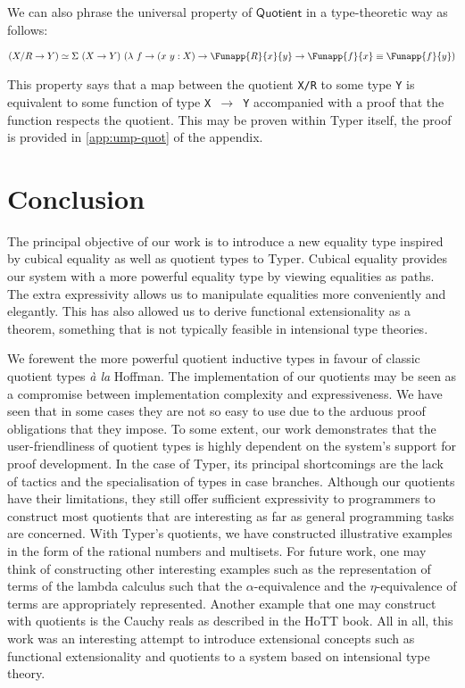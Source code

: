 \documentclass[12pt,twoside,maitrise]{dms}
\theoremstyle{definition}
\numberwithin{equation}{section}
\numberwithin{table}{chapter}
\numberwithin{figure}{chapter}
\newcommand\kw[1] {\textsf{#1}}
\newcommand\id[1] {\texttt{#1}}
\newcommand\fn[1] {\texttt{#1}}
\newcommand\latinphrase{\textit}
\begin{document}
We can also phrase the universal property of $\kw{Quotient}$ in a type-theoretic
way as follows:

\begin{align*}
  & (X/R \rightarrow Y) \simeq \Sigma \ (X \rightarrow Y) \ (\lambda \ f \rightarrow (x \ y : X) \rightarrow \Funapp{R}{x}{y} \rightarrow \Funapp{f}{x} \equiv \Funapp{f}{y}) \\
\end{align*}

This property says that a map between the quotient \fn{X/R} to some type \id{Y}
is equivalent to some function of type \fn{X $\rightarrow$ Y} accompanied with a
proof that the function respects the quotient. This may be proven within Typer
itself, the proof is provided in \autoref{app:ump-quot} of the appendix.

\chapter{Conclusion}

The principal objective of our work is to introduce a new equality type inspired
by cubical equality as well as quotient types to Typer. Cubical equality
provides our system with a more powerful equality type by viewing equalities as
paths. The extra expressivity allows us to manipulate equalities more
conveniently and elegantly. This has also allowed us to derive functional
extensionality as a theorem, something that is not typically feasible in
intensional type theories.

We forewent the more powerful quotient inductive types in favour of classic
quotient types \latinphrase{à la} Hoffman. The implementation of our quotients
may be seen as a compromise between implementation complexity and
expressiveness. We have seen that in some cases they are not so easy to use due
to the arduous proof obligations that they impose. To some extent, our work
demonstrates that the user-friendliness of quotient types is highly dependent on
the system's support for proof development. In the case of Typer, its principal
shortcomings are the lack of tactics and the specialisation of types in case
branches. Although our quotients have their limitations, they still offer
sufficient expressivity to programmers to construct most quotients that are
interesting as far as general programming tasks are concerned. With Typer's
quotients, we have constructed illustrative examples in the form of the rational
numbers and multisets. For future work, one may think of constructing other
interesting examples such as the representation of terms of the lambda calculus
such that the $\alpha$-equivalence and the $\eta$-equivalence of terms are
appropriately represented. Another example that one may construct with quotients
is the Cauchy reals as described in the HoTT book\cite[Chap. 11.3.1]{HoTTbook}.
All in all, this work was an interesting attempt to introduce extensional
concepts such as functional extensionality and quotients to a system based on
intensional type theory.
\end{document}
